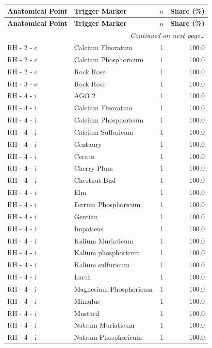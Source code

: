 \documentclass[a4paper,11pt]{article}
\begin{document}
\begin{footnotesize}
\begin{longtable}{p{3.5cm}p{7.5cm}rr}
\toprule
\textbf{Anatomical Point} &
\textbf{Trigger Marker} &
\textbf{$n$} &
\textbf{Share (\%)} \\
\midrule
\endfirsthead
\toprule
\textbf{Anatomical Point} &
\textbf{Trigger Marker} &
\textbf{$n$} &
\textbf{Share (\%)} \\
\midrule
\endhead
\midrule
\multicolumn{4}{r}{\footnotesize\emph{Continued on next page\ldots}} \\
\endfoot
\bottomrule
\endlastfoot
RH - 2 - c & Calcium Fluoratum & 1 & 100.0 \\
RH - 2 - c & Calcium Phosphoricum & 1 & 100.0 \\
RH - 2 - c & Rock Rose & 1 & 100.0 \\
RH - 3 - e & Rock Rose & 1 & 100.0 \\
RH - 4 - i & AGO 2 & 1 & 100.0 \\
RH - 4 - i & Calcium Fluoratum & 1 & 100.0 \\
RH - 4 - i & Calcium Phosphoricum & 1 & 100.0 \\
RH - 4 - i & Calcium Sulfuricum & 1 & 100.0 \\
RH - 4 - i & Centaury & 1 & 100.0 \\
RH - 4 - i & Cerato & 1 & 100.0 \\
RH - 4 - i & Cherry Plum & 1 & 100.0 \\
RH - 4 - i & Chestnut Bud & 1 & 100.0 \\
RH - 4 - i & Elm & 1 & 100.0 \\
RH - 4 - i & Ferrum Phosphoricum & 1 & 100.0 \\
RH - 4 - i & Gentian & 1 & 100.0 \\
RH - 4 - i & Impatiens & 1 & 100.0 \\
RH - 4 - i & Kalium Muriaticum & 1 & 100.0 \\
RH - 4 - i & Kalium phosphoricum & 1 & 100.0 \\
RH - 4 - i & Kalium sulfuricum & 1 & 100.0 \\
RH - 4 - i & Larch & 1 & 100.0 \\
RH - 4 - i & Magnesium Phosphoricum & 1 & 100.0 \\
RH - 4 - i & Mimulus & 1 & 100.0 \\
RH - 4 - i & Mustard & 1 & 100.0 \\
RH - 4 - i & Natrum Muriaticum & 1 & 100.0 \\
RH - 4 - i & Natrum Phosphoricum & 1 & 100.0 \\

\end{longtable}
\end{footnotesize}
\end{document}
